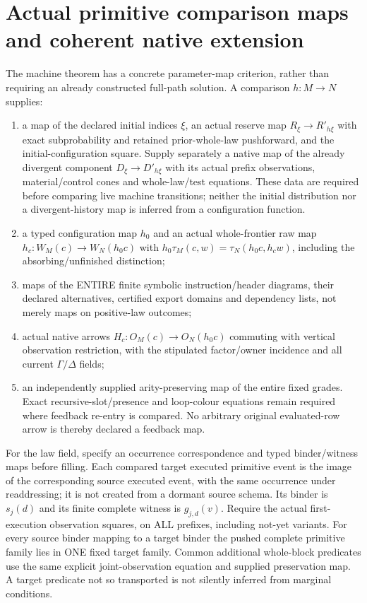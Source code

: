 \documentclass[11pt]{article}
\begin{document}
\section{Actual primitive comparison maps and coherent native extension}
The machine theorem has a concrete parameter-map criterion, rather than requiring an already constructed full-path solution. A comparison $h:M\to N$ supplies:
\begin{enumerate}
\item a map of the declared initial indices $\xi$, an actual reserve map $R_\xi\to R'_{h\xi}$ with exact subprobability and retained prior-whole-law pushforward, and the initial-configuration square. Supply separately a native map of the already divergent component $D_\xi\to D'_{h\xi}$ with its actual prefix observations, material/control cones and whole-law/test equations. These data are required before comparing live machine transitions; neither the initial distribution nor a divergent-history map is inferred from a configuration function.
\item a typed configuration map $h_0$ and an actual whole-frontier raw map $h_c:W_M(c)\to W_N(h_0c)$ with $h_0\tau_M(c,w)=\tau_N(h_0c,h_cw)$, including the absorbing/unfinished distinction;
\item maps of the ENTIRE finite symbolic instruction/header diagrams, their declared alternatives, certified export domains and dependency lists, not merely maps on positive-law outcomes;
\item actual native arrows $H_c:O_M(c)\to O_N(h_0c)$ commuting with vertical observation restriction, with the stipulated factor/owner incidence and all current $\Gamma/\Delta$ fields;
\item an independently supplied arity-preserving map of the entire fixed grades. Exact recursive-slot/presence and loop-colour equations remain required where feedback re-entry is compared. No arbitrary original evaluated-row arrow is thereby declared a feedback map.
\end{enumerate}
For the law field, specify an occurrence correspondence and typed binder/witness maps before filling. Each compared target executed primitive event is the image of the corresponding source executed event, with the same occurrence under readdressing; it is not created from a dormant source schema. Its binder is $s_j(d)$ and its finite complete witness is $g_{j,d}(v)$. Require the actual first-execution observation squares, on ALL prefixes, including not-yet variants. For every source binder mapping to a target binder the pushed complete primitive family lies in ONE fixed target family. Common additional whole-block predicates use the same explicit joint-observation equation and supplied preservation map. A target predicate not so transported is not silently inferred from marginal conditions.
\end{document}
